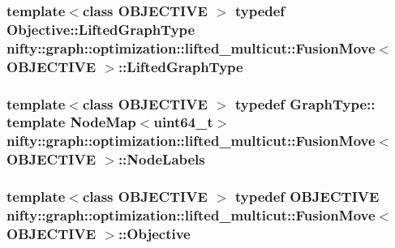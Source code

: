 \subsubsection[{Lifted\+Graph\+Type}]{\setlength{\rightskip}{0pt plus 5cm}template$<$class O\+B\+J\+E\+C\+T\+I\+V\+E $>$ typedef Objective\+::\+Lifted\+Graph\+Type {\bf nifty\+::graph\+::optimization\+::lifted\+\_\+multicut\+::\+Fusion\+Move}$<$ O\+B\+J\+E\+C\+T\+I\+V\+E $>$\+::{\bf Lifted\+Graph\+Type}}\label{classnifty_1_1graph_1_1optimization_1_1lifted__multicut_1_1FusionMove_ad30c58a21dfc387883cd14c1da13554b}
\hypertarget{classnifty_1_1graph_1_1optimization_1_1lifted__multicut_1_1FusionMove_af682848d662f2a0c22916e2c99de62d1}{}
\subsubsection[{Node\+Labels}]{\setlength{\rightskip}{0pt plus 5cm}template$<$class O\+B\+J\+E\+C\+T\+I\+V\+E $>$ typedef Graph\+Type\+:: template Node\+Map$<$uint64\+\_\+t$>$ {\bf nifty\+::graph\+::optimization\+::lifted\+\_\+multicut\+::\+Fusion\+Move}$<$ O\+B\+J\+E\+C\+T\+I\+V\+E $>$\+::{\bf Node\+Labels}}\label{classnifty_1_1graph_1_1optimization_1_1lifted__multicut_1_1FusionMove_af682848d662f2a0c22916e2c99de62d1}
\hypertarget{classnifty_1_1graph_1_1optimization_1_1lifted__multicut_1_1FusionMove_a83ed588b8a2f087185521b5fc73a61a1}{}
\subsubsection[{Objective}]{\setlength{\rightskip}{0pt plus 5cm}template$<$class O\+B\+J\+E\+C\+T\+I\+V\+E $>$ typedef O\+B\+J\+E\+C\+T\+I\+V\+E {\bf nifty\+::graph\+::optimization\+::lifted\+\_\+multicut\+::\+Fusion\+Move}$<$ O\+B\+J\+E\+C\+T\+I\+V\+E $>$\+::{\bf Objective}}\label{classnifty_1_1graph_1_1optimization_1_1lifted__multicut_1_1FusionMove_a83ed588b8a2f087185521b5fc73a61a1}


